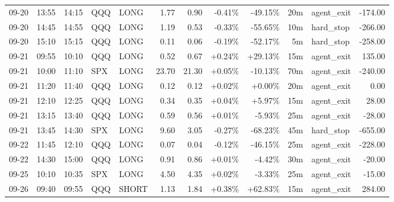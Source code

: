 \documentclass[11pt,a4paper]{article}
\begin{document}
\begin{center}
\begin{longtable}{>{\color{txtmain}}l l l l l r r r r r >{\color{txtmain}}l r}
09-20 & 13:55 & 14:15 & QQQ & LONG & 1.77 & 0.90 & \textcolor{lossred}{-0.41\%} & \textcolor{lossred}{-49.15\%} & 20m & agent\_exit & \textcolor{lossred}{-174.00} \\
09-20 & 14:45 & 14:55 & QQQ & LONG & 1.19 & 0.53 & \textcolor{lossred}{-0.33\%} & \textcolor{lossred}{-55.65\%} & 10m & hard\_stop & \textcolor{lossred}{-266.00} \\
09-20 & 15:10 & 15:15 & QQQ & LONG & 0.11 & 0.06 & \textcolor{lossred}{-0.19\%} & \textcolor{lossred}{-52.17\%} & 5m & hard\_stop & \textcolor{lossred}{-258.00} \\
09-21 & 09:55 & 10:10 & QQQ & LONG & 0.52 & 0.67 & \textcolor{wingreen}{+0.24\%} & \textcolor{wingreen}{+29.13\%} & 15m & agent\_exit & \textcolor{wingreen}{135.00} \\
09-21 & 10:00 & 11:10 & SPX & LONG & 23.70 & 21.30 & \textcolor{wingreen}{+0.05\%} & \textcolor{lossred}{-10.13\%} & 70m & agent\_exit & \textcolor{lossred}{-240.00} \\
09-21 & 11:20 & 11:40 & QQQ & LONG & 0.12 & 0.12 & \textcolor{wingreen}{+0.02\%} & \textcolor{wingreen}{+0.00\%} & 20m & agent\_exit & \textcolor{wingreen}{0.00} \\
09-21 & 12:10 & 12:25 & QQQ & LONG & 0.34 & 0.35 & \textcolor{wingreen}{+0.04\%} & \textcolor{wingreen}{+5.97\%} & 15m & agent\_exit & \textcolor{wingreen}{28.00} \\
09-21 & 13:15 & 13:40 & QQQ & LONG & 0.59 & 0.56 & \textcolor{wingreen}{+0.01\%} & \textcolor{lossred}{-5.93\%} & 25m & agent\_exit & \textcolor{lossred}{-28.00} \\
09-21 & 13:45 & 14:30 & SPX & LONG & 9.60 & 3.05 & \textcolor{lossred}{-0.27\%} & \textcolor{lossred}{-68.23\%} & 45m & hard\_stop & \textcolor{lossred}{-655.00} \\
09-22 & 11:45 & 12:10 & QQQ & LONG & 0.07 & 0.04 & \textcolor{lossred}{-0.12\%} & \textcolor{lossred}{-46.15\%} & 25m & agent\_exit & \textcolor{lossred}{-228.00} \\
09-22 & 14:30 & 15:00 & QQQ & LONG & 0.91 & 0.86 & \textcolor{wingreen}{+0.01\%} & \textcolor{lossred}{-4.42\%} & 30m & agent\_exit & \textcolor{lossred}{-20.00} \\
09-25 & 10:10 & 10:35 & SPX & LONG & 4.50 & 4.35 & \textcolor{wingreen}{+0.02\%} & \textcolor{lossred}{-3.33\%} & 25m & agent\_exit & \textcolor{lossred}{-15.00} \\
09-26 & 09:40 & 09:55 & QQQ & SHORT & 1.13 & 1.84 & \textcolor{wingreen}{+0.38\%} & \textcolor{wingreen}{+62.83\%} & 15m & agent\_exit & \textcolor{wingreen}{284.00} \\

\end{longtable}
\end{center}
\end{document}

